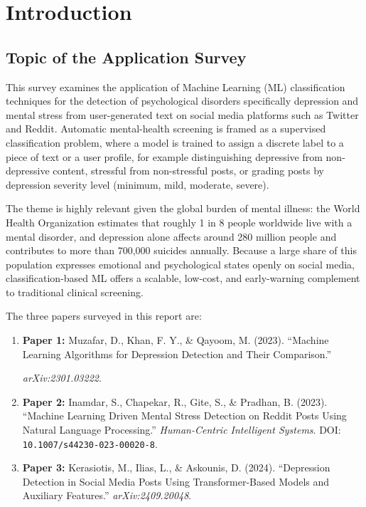 \documentclass[a4paper,12pt]{article}
\begin{document}
\setcounter{page}{1}       %

\section{Introduction}
\subsection{Topic of the Application Survey}
This survey examines the application of Machine Learning (ML) classification techniques for the detection of psychological disorders specifically depression and mental stress from user-generated text on social media platforms such as Twitter and Reddit. Automatic mental-health screening is framed as a supervised classification problem, where a model is trained to assign a discrete label to a piece of text or a user profile, for example distinguishing depressive from non-depressive content, stressful from non-stressful posts, or grading posts by depression severity level (minimum, mild, moderate, severe).

The theme is highly relevant given the global burden of mental illness: the World Health Organization estimates that roughly 1 in 8 people worldwide live with a mental disorder, and depression alone affects around 280 million people and contributes to more than 700,000 suicides annually. Because a large share of this population expresses emotional and psychological states openly on social media, classification-based ML offers a scalable, low-cost, and early-warning complement to traditional clinical screening.

The three papers surveyed in this report are:

\begin{enumerate}
    \item \textbf{Paper 1:} Muzafar, D., Khan, F. Y., \& Qayoom, M. (2023). 
    ``Machine Learning Algorithms for Depression Detection and Their Comparison.'' 
    
    \textit{arXiv:2301.03222}.

    \item \textbf{Paper 2:} Inamdar, S., Chapekar, R., Gite, S., \& Pradhan, B. (2023). 
    ``Machine Learning Driven Mental Stress Detection on Reddit Posts Using Natural Language Processing.'' 
    \textit{Human-Centric Intelligent Systems}. 
    DOI: \texttt{10.1007/s44230-023-00020-8}.

    \item \textbf{Paper 3:} Kerasiotis, M., Ilias, L., \& Askounis, D. (2024). 
    ``Depression Detection in Social Media Posts Using Transformer-Based Models and Auxiliary Features.'' 
    \textit{arXiv:2409.20048}.
\end{enumerate}
\end{document}
